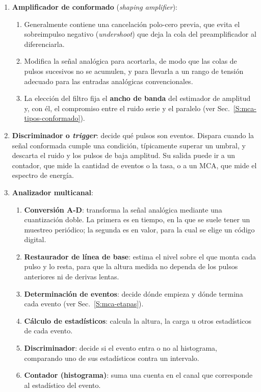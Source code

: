 \begin{enumerate}
  \item \textbf{Amplificador de conformado} (\emph{shaping amplifier}):
  \begin{enumerate}
    \item Generalmente contiene una cancelación polo-cero previa, que evita el
      sobreimpulso negativo (\emph{undershoot}) que deja la cola del
      preamplificador al diferenciarla.
    \item Modifica la señal analógica para acortarla, de modo que las colas de
      pulsos sucesivos no se acumulen, y para llevarla a un rango de tensión
      adecuado para las entradas analógicas convencionales.
    \item La elección del filtro fija el \textbf{ancho de banda} del estimador
      de amplitud y, con él, el compromiso entre el ruido serie y el paralelo
      (ver Sec.~\ref{S:mca-tipos-conformado}).
  \end{enumerate}
  \item \textbf{Discriminador o \emph{trigger}}: decide qué pulsos son eventos. Dispara
    cuando la señal conformada cumple una condición, típicamente superar un
    umbral, y descarta el ruido y los pulsos de baja amplitud. Su salida puede
    ir a un contador, que mide la cantidad de eventos o la tasa, o a un MCA, que
    mide el espectro de energía.
  \item \textbf{Analizador multicanal}:
  \begin{enumerate}
    \item \textbf{Conversión A-D}: transforma la señal analógica mediante una
      cuantización doble. La primera es en tiempo, en la que se suele tener un
      muestreo periódico; la segunda es en valor, para la cual se elige un
      código digital.
    \item \textbf{Restaurador de línea de base}: estima el nivel sobre el que
      monta cada pulso y lo resta, para que la altura medida no dependa de los
      pulsos anteriores ni de derivas lentas.
    \item \textbf{Determinación de eventos}: decide dónde empieza y dónde
      termina cada evento (ver Sec.~\ref{S:mca-etapas}).
    \item \textbf{Cálculo de estadísticos}: calcula la altura, la carga u otros
      estadísticos de cada evento.
    \item \textbf{Discriminador}: decide si el evento entra o no al histograma,
      comparando uno de sus estadísticos contra un intervalo.
    \item \textbf{Contador (histograma)}: suma una cuenta en el canal que
      corresponde al estadístico del evento.
  \end{enumerate}
\end{enumerate}

